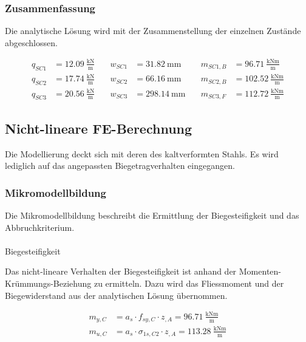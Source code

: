 \documentclass[
  11pt,
  letterpaper,
]{scrreprt}
\makeatletter
\let\oldparagraph\paragraph
\renewcommand{\paragraph}{
    \@ifstar
      \xxxParagraphStar
      \xxxParagraphNoStar
  }
\newcommand{\xxxParagraphStar}[1]{\oldparagraph*{#1}\mbox{}}
\newcommand{\xxxParagraphNoStar}[1]{\oldparagraph{#1}\mbox{}}
\makeatother
\begin{document}
\subsubsection{Zusammenfassung}\label{zusammenfassung-4}

Die analytische Lösung wird mit der Zusammenstellung der einzelnen
Zustände abgeschlossen.

\[
\begin{aligned}
q_{SC1}& = 12.09 \ \frac{\mathrm{kN}}{\mathrm{m}} \quad & w_{SC1}& = 31.82 \ \mathrm{mm} \quad & m_{SC1 , B}& = 96.71 \ \frac{\mathrm{kNm}}{\mathrm{m}} \\ 
q_{SC2}& = 17.74 \ \frac{\mathrm{kN}}{\mathrm{m}} \quad & w_{SC2}& = 66.16 \ \mathrm{mm} \quad & m_{SC2 , B}& = 102.52 \ \frac{\mathrm{kNm}}{\mathrm{m}} \\ 
q_{SC3}& = 20.56 \ \frac{\mathrm{kN}}{\mathrm{m}} \quad & w_{SC3}& = 298.14 \ \mathrm{mm} \quad & m_{SC3 , F}& = 112.72 \ \frac{\mathrm{kNm}}{\mathrm{m}} \end{aligned}
\]

\subsection{Nicht-lineare
FE-Berechnung}\label{nicht-lineare-fe-berechnung-1}

Die Modellierung deckt sich mit deren des kaltverformten Stahls. Es wird
lediglich auf das angepassten Biegetragverhalten eingegangen.

\subsubsection{Mikromodellbildung}\label{mikromodellbildung-6}

Die Mikromodellbildung beschreibt die Ermittlung der Biegesteifigkeit
und das Abbruchkriterium.

\paragraph{Biegesteifigkeit}\label{biegesteifigkeit-2}

Das nicht-lineare Verhalten der Biegesteifigkeit ist anhand der
Momenten-Krümmungs-Beziehung zu ermitteln. Dazu wird das Fliessmoment
und der Biegewiderstand aus der analytischen Lösung übernommen.

\[
\begin{aligned}
m_{y , C}& = a_{s} \cdot f_{sy , C} \cdot z_{, A} = 96.71 \ \frac{\mathrm{kNm}}{\mathrm{m}} \\ 
m_{u , C}& = a_{s} \cdot \sigma_{1 s , C2} \cdot z_{, A} = 113.28 \ \frac{\mathrm{kNm}}{\mathrm{m}} \end{aligned}
\]
\end{document}
